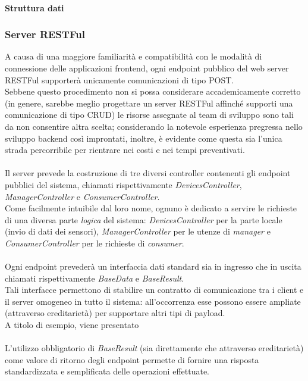 \documentclass[12pt]{article}
\begin{document}
\paragraph{Struttura dati}

\subsubsection{Server RESTFul}
A causa di una maggiore familiarità e compatibilità con le modalità di connessione delle applicazioni frontend, ogni endpoint pubblico del web server RESTFul supporterà unicamente comunicazioni di tipo POST.\\
Sebbene questo procedimento non si possa considerare accademicamente corretto (in genere, sarebbe meglio progettare un server RESTFul affinché supporti una comunicazione di tipo CRUD) le risorse assegnate al team di sviluppo sono tali da non consentire altra scelta; considerando la notevole esperienza pregressa nello sviluppo backend così improntati, inoltre, è evidente come questa sia l'unica strada percorribile per rientrare nei costi e nei tempi preventivati.\\\\

Il server prevede la costruzione di tre diversi controller contenenti gli endpoint pubblici del sistema, chiamati rispettivamente \textit{DevicesController}, \textit{ManagerController} e \textit{ConsumerController}.\\
Come facilmente intuibile dal loro nome, ognuno è dedicato a servire le richieste di una diversa parte \textit{logica} del sistema: \textit{DevicesController} per la parte locale (invio di dati dei sensori), \textit{ManagerController} per le utenze di \textit{manager} e \textit{ConsumerController} per le richieste di \textit{consumer}.\\\\
Ogni endpoint prevederà un interfaccia dati standard sia in ingresso che in uscita chiamati rispettivamente \textit{BaseData} e \textit{BaseResult}.\\
Tali interfacce permettono di stabilire un contratto di comunicazione tra i client e il server omogeneo in tutto il sistema: all'occorrenza esse possono essere ampliate (attraverso ereditarietà) per supportare altri tipi di payload.\\
A titolo di esempio, viene presentato \\\\%
L'utilizzo obbligatorio di \textit{BaseResult} (sia direttamente che attraverso ereditarietà) come valore di ritorno degli endpoint permette di fornire una risposta standardizzata e semplificata delle operazioni effettuate.
\end{document}
